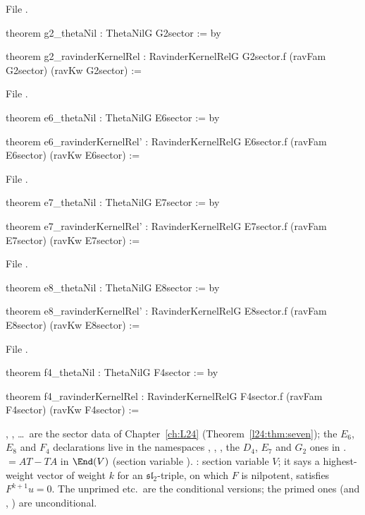 \noindent File .
\begin{leancode}
theorem g2_thetaNil : ThetaNilG G2sector := by

theorem g2_ravinderKernelRel : RavinderKernelRelG G2sector.f (ravFam G2sector) (ravKw G2sector) :=
\end{leancode}
\noindent File .
\begin{leancode}
theorem e6_thetaNil : ThetaNilG E6sector := by

theorem e6_ravinderKernelRel' : RavinderKernelRelG E6sector.f (ravFam E6sector) (ravKw E6sector) :=
\end{leancode}
\noindent File .
\begin{leancode}
theorem e7_thetaNil : ThetaNilG E7sector := by

theorem e7_ravinderKernelRel' : RavinderKernelRelG E7sector.f (ravFam E7sector) (ravKw E7sector) :=
\end{leancode}
\noindent File .
\begin{leancode}
theorem e8_thetaNil : ThetaNilG E8sector := by

theorem e8_ravinderKernelRel' : RavinderKernelRelG E8sector.f (ravFam E8sector) (ravKw E8sector) :=
\end{leancode}
\noindent File .
\begin{leancode}
theorem f4_thetaNil : ThetaNilG F4sector := by

theorem f4_ravinderKernelRel : RavinderKernelRelG F4sector.f (ravFam F4sector) (ravKw F4sector) :=
\end{leancode}

\begin{dictionary}
, , \dots\ are the sector data of Chapter~\ref{ch:L24} (Theorem~\ref{l24:thm:seven}); the
$E_6$, $E_8$ and $F_4$ declarations live in the namespaces , , , the $D_4$, $E_7$ and $G_2$ ones in .
 $=AT-TA$ in $\End(V)$ (section variable ). : section variable $V$; it says a highest-weight
vector of weight $k$ for an $\mathfrak{sl}_2$-triple, on which $F$ is nilpotent, satisfies $F^{k+1}u=0$. The unprimed
 etc.\ are the conditional versions; the primed ones (and
, ) are unconditional.
\end{dictionary}

